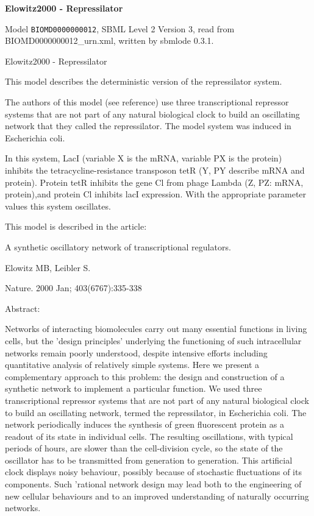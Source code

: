 \documentclass{article}
\begin{document}
{\centering\LARGE\bfseries Elowitz2000 - Repressilator\par}
\bigskip

Model \texttt{BIOMD0000000012}, SBML Level 2 Version 3, read from BIOMD0000000012\_\allowbreak{}urn.xml, written by sbmlode 0.3.1.

Elowitz2000 - Repressilator

This model describes the deterministic version of the repressilator system.

The authors of this model (see reference) use three transcriptional repressor systems that are not part of any natural biological clock to build an oscillating network that they called the repressilator. The model system was induced in Escherichia coli.

In this system, LacI (variable X is the mRNA, variable PX is the protein) inhibits the tetracycline-resistance transposon tetR (Y, PY describe mRNA and protein). Protein tetR inhibits the gene Cl from phage Lambda (Z, PZ: mRNA, protein),and protein Cl inhibits lacI expression. With the appropriate parameter values this system oscillates.

This model is described in the article:

A synthetic oscillatory network of transcriptional regulators.

Elowitz MB, Leibler S.

Nature. 2000 Jan; 403(6767):335-338

Abstract:

Networks of interacting biomolecules carry out many essential functions in living cells, but the 'design principles' underlying the functioning of such intracellular networks remain poorly understood, despite intensive efforts including quantitative analysis of relatively simple systems. Here we present a complementary approach to this problem: the design and construction of a synthetic network to implement a particular function. We used three transcriptional repressor systems that are not part of any natural biological clock to build an oscillating network, termed the repressilator, in Escherichia coli. The network periodically induces the synthesis of green fluorescent protein as a readout of its state in individual cells. The resulting oscillations, with typical periods of hours, are slower than the cell-division cycle, so the state of the oscillator has to be transmitted from generation to generation. This artificial clock displays noisy behaviour, possibly because of stochastic fluctuations of its components. Such 'rational network design may lead both to the engineering of new cellular behaviours and to an improved understanding of naturally occurring networks.
\end{document}
